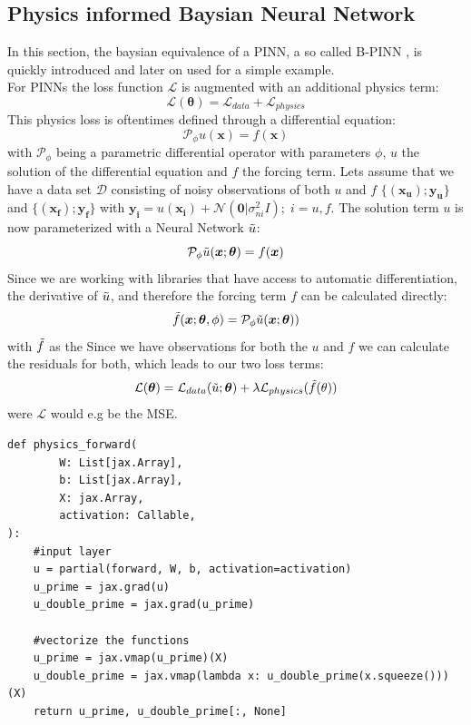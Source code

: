 \documentclass{article}
\begin{document}
\subsection{Physics informed Baysian Neural Network}
In this section, the baysian equivalence of a PINN, a so called B-PINN \cite{Yang_2021}, is quickly introduced and later on used for a simple example. \\
For PINNs the loss function $\mathcal{L}$ is augmented with an additional physics term:
\begin{equation}
    \mathcal{L}(\bm \theta) = \mathcal{L}_{data} + \mathcal{L}_{physics}
\end{equation}
This physics loss is oftentimes defined through a differential equation:
\begin{equation}
    \mathcal{P}_\phi u(\bm x) = f(\bm x)
\end{equation}
with $\mathcal{P}_\phi$ being a parametric differential operator with parameters $\phi$, $u$ the solution of the differential equation and $f$ the forcing term. Lets assume that we have a data set $\mathcal{D}$ consisting of noisy observations of both $u$ and $f$ $\{(\bm{x_u});\bm{y_u}\}$ and $\{(\bm{x_f});\bm{y_f}\}$ with $\bm{y_i} = u(\bm{x_i}) + \mathcal{N}(\bm{0}|\sigma_{ni}^2 I) ; \; i = u,f$. The solution term $u$ is now parameterized with a Neural Network $\Tilde{u}$:
\begin{equation}
    \mathcal{P}_\phi \Tilde{u}(\bm x; \bm \theta) = f(\bm x)
\end{equation}
Since we are working with libraries that have access to automatic differentiation, the derivative of $\Tilde{u}$, and therefore the forcing term $f$ can be calculated directly:
\begin{equation}
    \Tilde{f}(\bm x;\bm \theta, \phi) = \mathcal{P}_\phi \Tilde{u}(\bm x; \bm \theta))
\end{equation}
with $ \Tilde{f}$ as the 
Since we have observations for both the $u$ and $f$ we can calculate the residuals for both, which leads to our two loss terms:
\begin{equation}
    \mathcal{L}(\bm \theta) = \mathcal{L}_{data}(\Tilde{u}; \bm \theta) + \lambda \mathcal{L}_{physics}(\Tilde{f}(\theta))
\end{equation}
were $\mathcal{L}$ would e.g be the MSE.
\begin{lstlisting}[caption= {Physics Informed Neural Net},captionpos=t]
def physics_forward(
        W: List[jax.Array],
        b: List[jax.Array],
        X: jax.Array,
        activation: Callable,
):
    #input layer
    u = partial(forward, W, b, activation=activation)
    u_prime = jax.grad(u)
    u_double_prime = jax.grad(u_prime)

    #vectorize the functions
    u_prime = jax.vmap(u_prime)(X)
    u_double_prime = jax.vmap(lambda x: u_double_prime(x.squeeze()))(X)
    return u_prime, u_double_prime[:, None]
\end{lstlisting}
\end{document}
